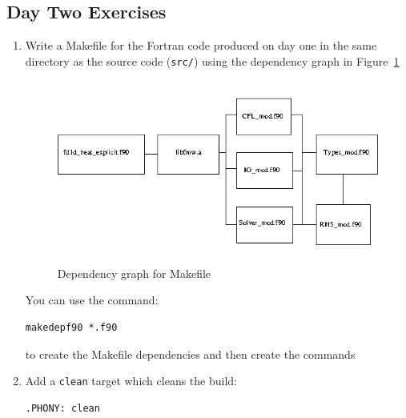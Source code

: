 \documentclass[12pt]{article}
\begin{document}
\subsection*{Day Two Exercises}
\begin{enumerate}
\item Write a Makefile for the Fortran code produced on day one in the same directory as the source
  code (\texttt{src/}) using the dependency graph in Figure~\ref{make_depend:eps}
\begin{figure}[H]
\includegraphics[height=6cm]{make_depend.png}
\caption{Dependency graph for Makefile}
\label{make_depend:eps}
\end{figure}
You can use the command:
\begin{verbatim}
makedepf90 *.f90
\end{verbatim}
to create the Makefile dependencies and then create the commands
\item Add a \texttt{clean} target which cleans the build:
\begin{verbatim}
.PHONY: clean


\end{verbatim}
\end{enumerate}
\end{document}
